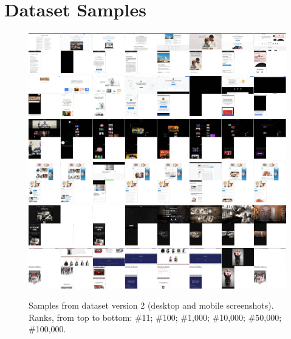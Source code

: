 \section{Dataset Samples}

\begin{figure}[h]
    \centering
    \includegraphics[clip,width=\columnwidth]{resources/dataset/v2-000011.png}\vspace{4mm}
    \includegraphics[clip,width=\columnwidth]{resources/dataset/v2-000100.png}\vspace{4mm}
    \includegraphics[clip,width=\columnwidth]{resources/dataset/v2-001000.png}\vspace{4mm}
    \includegraphics[clip,width=\columnwidth]{resources/dataset/v2-010000.png}\vspace{4mm}
    \includegraphics[clip,width=\columnwidth]{resources/dataset/v2-050000.png}\vspace{4mm}
    \includegraphics[clip,width=\columnwidth]{resources/dataset/v2-100000.png}
    \caption[Samples from dataset version 2]{Samples from dataset version 2 (desktop and mobile screenshots). Ranks, from top to bottom: \#11; \#100; \#1,000; \#10,000; \#50,000; \#100,000.}
    \label{fig:dataset samples}
\end{figure}